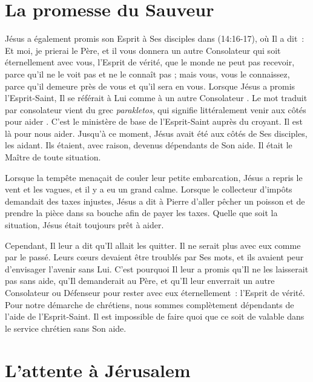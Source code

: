 \section{La promesse du Sauveur}

\begin{specialpar}{\BRallowhypbch}
Jésus a également promis son Esprit à Ses disciples dans
 (14:16-17), où Il a dit~:
 \og Et moi, je prierai le Père, et il vous donnera un autre Consolateur
 qui soit éternellement avec vous, l'Esprit de vérité, que le monde ne peut
 pas recevoir, parce qu'il ne le voit pas et ne le connaît pas ; mais vous,
 vous le connaissez, parce qu'il demeure près de vous
 et qu'il sera en vous. \fg{}
 Lorsque Jésus a promis l'Esprit-Saint, Il se référait à Lui comme à
 \og un autre Consolateur \fg{}.
 Le mot traduit par consolateur vient du grec \emph{parakletos},
 qui signifie littéralement \og venir aux côtés pour aider \fg{}.
 C'est le ministère de base de l'Esprit-Saint auprès du croyant.
 Il est là pour nous aider. Jusqu'à ce moment, Jésus avait été aux côtés
 de Ses disciples, les aidant. Ils étaient, avec raison, devenus dépendants
 de Son aide. Il était le Maître de toute situation.
\end{specialpar}

Lorsque la tempête menaçait de couler leur petite embarcation, Jésus
 a repris le vent et les vagues, et il y a eu un grand calme.
 Lorsque le collecteur d'impôts demandait des taxes injustes,
 Jésus a dit à Pierre d'aller pêcher un poisson et de prendre
 la pièce dans sa bouche afin de payer les taxes.
 Quelle que soit la situation, Jésus était toujours prêt à aider.

Cependant, Il leur a dit qu'Il allait les quitter.
 Il ne serait plus avec eux comme par le passé.
 Leurs cœurs devaient être troublés par Ses mots,
 et ils avaient peur d'envisager l'avenir sans Lui.
 C'est pourquoi Il leur a promis qu'Il ne les laisserait pas sans aide,
 qu'Il demanderait au Père, et qu'Il leur enverrait un autre Consolateur
 ou Défenseur pour rester avec eux éternellement~:
 l'Esprit de vérité.
 Pour notre démarche de chrétiens, nous sommes complètement dépendants de
 l'aide de l'Esprit-Saint.
 Il est impossible de faire quoi que ce soit de valable dans le service
 chrétien sans Son aide.

\section{L'attente à Jérusalem}


